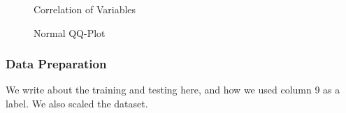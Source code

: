 \documentclass[12pt]{article}
\begin{document}
\begin{enumerate}
		\begin{figure}[h!]
		\centering
		\begin{minipage}{0.48\textwidth}
			\caption{Correlation of Variables} 
			\label{fig:corplot}
		\end{minipage}
		\hfill %
		\centering
		\begin{minipage}{0.48\textwidth}
			\centering
			\caption{Normal QQ-Plot} 
			\label{fig:qqplot}
		\end{minipage}
	\end{figure}
		
\end{enumerate} 
 

\subsubsection{Data Preparation} 

We write about the training and testing here, and how we used column 9 as a label. We also scaled the dataset.\\
\end{document}
